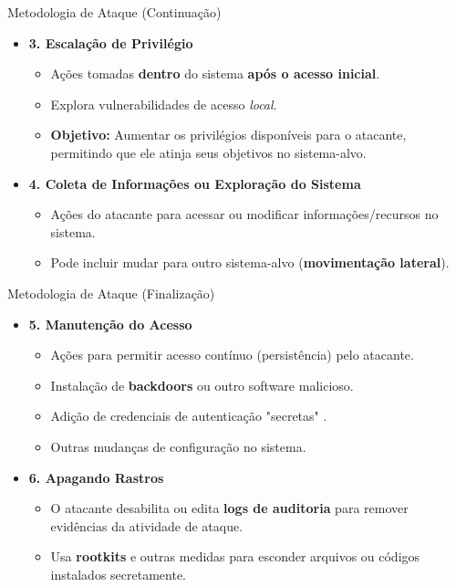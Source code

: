 \begin{frame}{Metodologia de Ataque (Continuação)}
    \begin{itemize}
        \item \textbf{3. Escalação de Privilégio}
              \begin{itemize}
                  \item Ações tomadas \textbf{dentro} do sistema \textbf{após o acesso inicial}.
                  \item Explora vulnerabilidades de acesso \textit{local}.
                  \item \textbf{Objetivo:} Aumentar os privilégios disponíveis para o atacante, permitindo que ele atinja seus objetivos no sistema-alvo.
              \end{itemize}

        \item \textbf{4. Coleta de Informações ou Exploração do Sistema}
              \begin{itemize}
                  \item Ações do atacante para acessar ou modificar informações/recursos no sistema.
                  \item Pode incluir mudar para outro sistema-alvo (\textbf{movimentação lateral}).
              \end{itemize}
    \end{itemize}
\end{frame}

\begin{frame}{Metodologia de Ataque (Finalização)}
    \begin{itemize}
        \item \textbf{5. Manutenção do Acesso}
              \begin{itemize}
                  \item Ações para permitir acesso contínuo (persistência) pelo atacante.
                  \item Instalação de \textbf{backdoors} ou outro software malicioso.
                  \item Adição de credenciais de autenticação "secretas" .
                  \item Outras mudanças de configuração no sistema.
              \end{itemize}

        \item \textbf{6. Apagando Rastros}
              \begin{itemize}
                  \item O atacante desabilita ou edita \textbf{logs de auditoria} para remover evidências da atividade de ataque.
                  \item Usa \textbf{rootkits} e outras medidas para esconder arquivos ou códigos instalados secretamente.
              \end{itemize}
    \end{itemize}
\end{frame}

